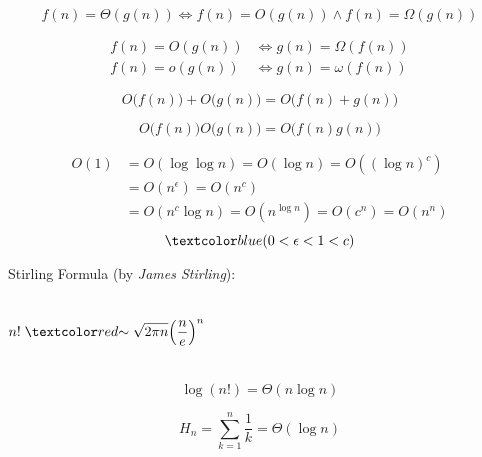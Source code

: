\begin{frame}{}
  \[
    f(n) = \Theta(g(n)) \iff f(n) = O(g(n)) \land f(n) = \Omega(g(n))
  \]

  \begin{align*}
    f(n) = O(g(n)) &\iff g(n) = \Omega(f(n)) \\[6pt]
    f(n) = o(g(n)) &\iff g(n) = \omega(f(n))
  \end{align*}
\end{frame}

\begin{frame}{}
  \[
    O\big(f(n)\big) + O\big(g(n)\big) = O\big(f(n) + g(n)\big)
  \]

  \pause
  \[
    O\big(f(n)\big) O\big(g(n)\big) = O\big(f(n) g(n)\big)
  \]
\end{frame}

\begin{frame}{}
  \begin{center}
  \end{center}

  \pause
  \begin{align*}
    O(1) &= O(\log \log n) = O(\log n) = O((\log n)^{c}) \\[6pt]
    &= O(n^{\epsilon}) = O(n^c) \\[6pt]
    &= O(n^{c} \log n) = O(n^{\log n}) = O(c^n) = O(n^n)
  \end{align*}
  \[
    \blue{(0 < \epsilon < 1 < c)}
  \]
\end{frame}

\begin{frame}{}
\end{frame}

\begin{frame}{}
  \begin{alertblock}{Stirling Formula (by {\it James Stirling}):}
    \begin{columns}
        \[
        n! \;\red{\sim}\; \sqrt{2 \pi n} \Big(\frac{n}{e}\Big)^{n}
        \]
    \end{columns}
  \end{alertblock}

  \pause
  \[
    \log(n!) = \Theta(n \log n)
  \]

  \pause
  \[
    H_n = \sum_{k=1}^{n} \frac{1}{k} = \Theta(\log n)
  \]
\end{frame}
